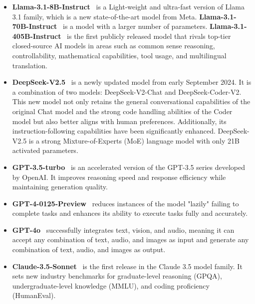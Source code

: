 \begin{itemize}[left=10pt]
    \item \textbf{Llama-3.1-8B-Instruct}~\cite{Llama-3.1-8B-Instruct} is a Light-weight and ultra-fast version of Llama 3.1 family, which is a new state-of-the-art model from Meta. \textbf{Llama-3.1-70B-Instruct}~\cite{Llama-3.1-70B-Instruct} is a model with a larger number of parameters. \textbf{Llama-3.1-405B-Instruct}~\cite{Llama-3.1-405B-Instruct} is the first publicly released model that rivals top-tier closed-source AI models in areas such as common sense reasoning, controllability, mathematical capabilities, tool usage, and multilingual translation.
    \item \textbf{DeepSeek-V2.5}~\cite{deepseekv2} is a newly updated model from early September 2024. It is a combination of two models: DeepSeek-V2-Chat and DeepSeek-Coder-V2. This new model not only retains the general conversational capabilities of the original Chat model and the strong code handling abilities of the Coder model but also better aligns with human preferences. Additionally, its instruction-following capabilities have been significantly enhanced. DeepSeek-V2.5 is a strong Mixture-of-Experts (MoE) language model with only 21B activated parameters.
    \item \textbf{GPT-3.5-turbo}~\cite{gpt-3-5-turbo} is an accelerated version of the GPT-3.5 series developed by OpenAI. It improves reasoning speed and response efficiency while maintaining generation quality.
    \item \textbf{GPT-4-0125-Preview}~\cite{gpt-4-0125-preview} reduces instances of the model "lazily" failing to complete tasks and enhances its ability to execute tasks fully and accurately.
    \item \textbf{GPT-4o}~\cite{gpt-4o} successfully integrates text, vision, and audio, meaning it can accept any combination of text, audio, and images as input and generate any combination of text, audio, and images as output.
    \item \textbf{Claude-3.5-Sonnet}~\cite{Claude} is the first release in the Claude 3.5 model family. It sets new industry benchmarks for graduate-level reasoning (GPQA), undergraduate-level knowledge (MMLU), and coding proficiency (HumanEval).
\end{itemize}




